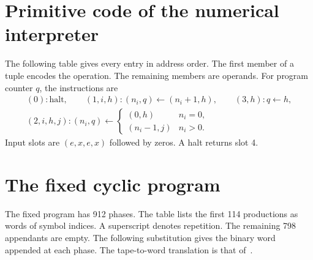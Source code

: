\documentclass[11pt,letterpaper,oneside,reqno]{amsart}
\begin{document}
\appendix

\section{Primitive code of the numerical interpreter}\label{app:code}
The following table gives every entry in address order. The first member of a tuple encodes the operation. The remaining members are operands. For program counter \(q\), the instructions are
\[
 \begin{gathered}(0):\mathrm{halt},\qquad (1,i,h):(n_i,q)\gets(n_i+1,h),\qquad(3,h):q\gets h,\\
 (2,i,h,j): (n_i,q)\gets
 \begin{cases}(0,h)&n_i=0,\\(n_i-1,j)&n_i>0.\end{cases}\end{gathered}
\]
Input slots are \((e,x,e,x)\) followed by zeros. A halt returns slot 4.

\section{The fixed cyclic program}
The fixed program has 912 phases. The table lists the first 114 productions as words of symbol indices. A superscript denotes repetition. The remaining 798 appendants are empty. The following substitution gives the binary word appended at each phase. The tape-to-word translation is that of~\cite{filin}.

\clearpage
\begingroup\raggedright


\endgroup
\end{document}
